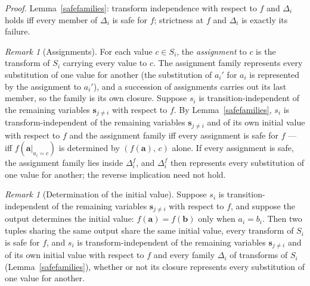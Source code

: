 \documentclass{article}
\theoremstyle{definition}
\theoremstyle{remark}
\newtheorem{remark}[proposition]{Remark}
\begin{document}
\noindent \textit{Proof.} Lemma~\ref{safefamilies}: transform independence with respect to $f$ and $\Delta_i$ holds iff every member of $\Delta_i$ is safe for $f$; strictness at $f$ and $\Delta_i$ is exactly its failure.

\begin{remark}[Assignments]
\label{assignments}
For each value $c \in S_i$, the \textit{assignment} to $c$ is the transform of $S_i$ carrying every value to $c$. The assignment family represents every substitution of one value for another (the substitution of $a_i'$ for $a_i$ is represented by the assignment to $a_i'$), and a succession of assignments carries out its last member, so the family is its own closure. Suppose $s_i$ is transition-independent of the remaining variables $\boldsymbol{s}_{j \neq i}$ with respect to $f$. By Lemma~\ref{safefamilies}, $s_i$ is transform-independent of the remaining variables $\boldsymbol{s}_{j \neq i}$ and of its own initial value with respect to $f$ and the assignment family iff every assignment is safe for $f$ --- iff $f(\boldsymbol{a}|_{a_i = c})$ is determined by $(f(\boldsymbol{a}),\, c)$ alone. If every assignment is safe, the assignment family lies inside $\Delta_i^f$, and $\Delta_i^f$ then represents every substitution of one value for another; the reverse implication need not hold.
\end{remark}

\begin{remark}[Determination of the initial value]
\label{valuedetermination}
Suppose $s_i$ is transition-independent of the remaining variables $\boldsymbol{s}_{j \neq i}$ with respect to $f$, and suppose the output determines the initial value: $f(\boldsymbol{a}) = f(\boldsymbol{b})$ only when $a_i = b_i$. Then two tuples sharing the same output share the same initial value, every transform of $S_i$ is safe for $f$, and $s_i$ is transform-independent of the remaining variables $\boldsymbol{s}_{j \neq i}$ and of its own initial value with respect to $f$ and every family $\Delta_i$ of transforms of $S_i$ (Lemma~\ref{safefamilies}), whether or not its closure represents every substitution of one value for another.
\end{remark}
\end{document}
